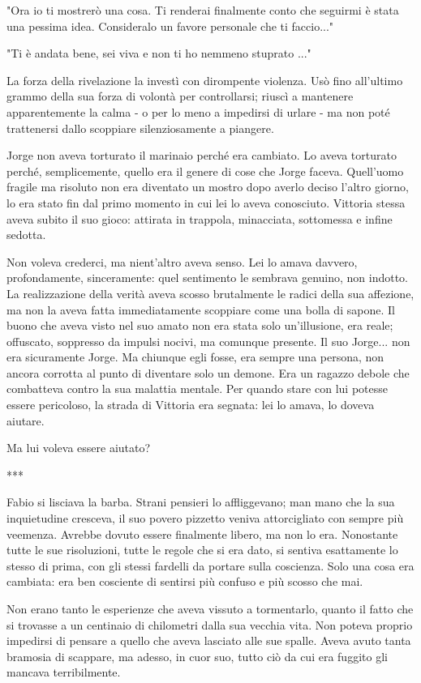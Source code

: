 "Ora io ti mostrerò una cosa. Ti renderai finalmente conto che seguirmi è stata una pessima idea. Consideralo un favore personale che ti faccio..."

"Ti è andata bene, sei viva e non ti ho nemmeno stuprato ..."

La forza della rivelazione la investì con dirompente violenza. Usò fino all'ultimo grammo della sua forza di volontà per controllarsi; riuscì a mantenere apparentemente la calma - o per lo meno a impedirsi di urlare - ma non poté trattenersi dallo scoppiare silenziosamente a piangere.

Jorge non aveva torturato il marinaio perché era cambiato. Lo aveva torturato perché, semplicemente, quello era il genere di cose che Jorge faceva. Quell'uomo fragile ma risoluto non era diventato un mostro dopo averlo deciso l'altro giorno, lo era stato fin dal primo momento in cui lei lo aveva conosciuto. Vittoria stessa aveva subito il suo gioco: attirata in trappola, minacciata, sottomessa e infine sedotta.

Non voleva crederci, ma nient'altro aveva senso. Lei lo amava davvero, profondamente, sinceramente: quel sentimento le sembrava genuino, non indotto. La realizzazione della verità aveva scosso brutalmente le radici della sua affezione, ma non la aveva fatta immediatamente scoppiare come una bolla di sapone. Il buono che aveva visto nel suo amato non era stata solo un'illusione, era reale; offuscato, soppresso da impulsi nocivi, ma comunque presente. Il suo Jorge... non era sicuramente Jorge. Ma chiunque egli fosse, era sempre una persona, non ancora corrotta al punto di diventare solo un demone. Era un ragazzo debole che combatteva contro la sua malattia mentale. Per quando stare con lui potesse essere pericoloso, la strada di Vittoria era segnata: lei lo amava, lo doveva aiutare.

Ma lui voleva essere aiutato?

***

Fabio si lisciava la barba. Strani pensieri lo affliggevano; man mano che la sua inquietudine cresceva, il suo povero pizzetto veniva attorcigliato con sempre più veemenza. Avrebbe dovuto essere finalmente libero, ma non lo era. Nonostante tutte le sue risoluzioni, tutte le regole che si era dato, si sentiva esattamente lo stesso di prima, con gli stessi fardelli da portare sulla coscienza. Solo una cosa era cambiata: era ben cosciente di sentirsi più confuso e più scosso che mai.

Non erano tanto le esperienze che aveva vissuto a tormentarlo, quanto il fatto che si trovasse a un centinaio di chilometri dalla sua vecchia vita. Non poteva proprio impedirsi di pensare a quello che aveva lasciato alle sue spalle. Aveva avuto tanta bramosia di scappare, ma adesso, in cuor suo, tutto ciò da cui era fuggito gli mancava terribilmente.

